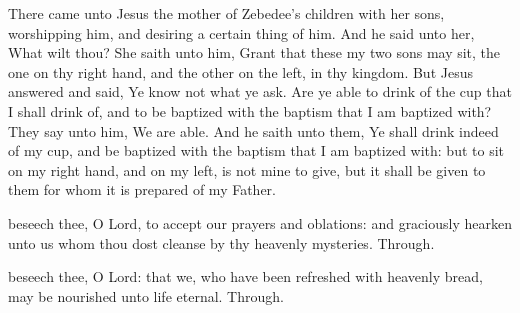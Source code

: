 
 There came unto Jesus the mother of Zebedee's children with her sons, worshipping him, and desiring a certain thing of him. And he said unto her, What wilt thou? She saith unto him, Grant that these my two sons may sit, the one on thy right hand, and the other on the left, in thy kingdom. But Jesus answered and said, Ye know not what ye ask. Are ye able to drink of the cup that I shall drink of, and to be baptized with the baptism that I am baptized with? They say unto him, We are able. And he saith unto them, Ye shall drink indeed of my cup, and be baptized with the baptism that I am baptized with: but to sit on my right hand, and on my left, is not mine to give, but it shall be given to them for whom it is prepared of my Father.


\secret
{} beseech thee, O Lord, to accept our prayers and oblations: and graciously hearken unto us whom thou dost cleanse by thy heavenly mysteries. Through.


\postcommunion
{} beseech thee, O Lord: that we, who have been refreshed with heavenly bread, may be nourished unto life eternal. Through.


